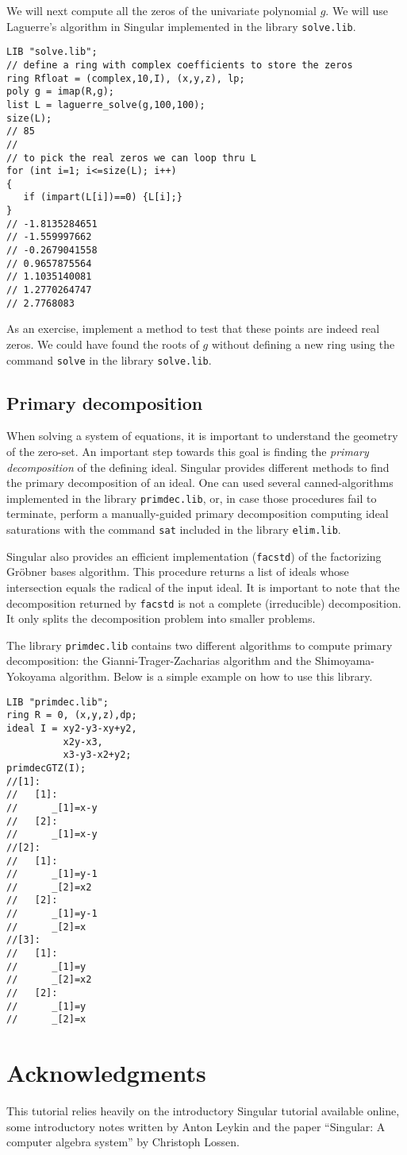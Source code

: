 \documentclass[12pt]{amsart}
\begin{document}
We will next compute all the zeros of the univariate polynomial $g$.
We will use Laguerre's algorithm in Singular implemented in the library
\texttt{solve.lib}.

\begin{verbatim}
LIB "solve.lib";
// define a ring with complex coefficients to store the zeros
ring Rfloat = (complex,10,I), (x,y,z), lp;
poly g = imap(R,g);
list L = laguerre_solve(g,100,100);
size(L);
// 85
//
// to pick the real zeros we can loop thru L
for (int i=1; i<=size(L); i++)
{
   if (impart(L[i])==0) {L[i];}
}
// -1.8135284651
// -1.559997662
// -0.2679041558
// 0.9657875564
// 1.1035140081
// 1.2770264747
// 2.7768083
\end{verbatim}

As an exercise, implement a method to test that these points are indeed real zeros. 
We could have found the roots of $g$ without defining a new ring
using the command \texttt{solve} in the library \texttt{solve.lib}.

\subsection{Primary decomposition}

When solving a system of equations, it is important to understand the geometry
of the zero-set. An important step towards this goal is finding the \emph{primary decomposition}
of the defining ideal. Singular provides different methods to find the primary decomposition
of an ideal. One can used several canned-algorithms implemented in the library \texttt{primdec.lib},
or, in case those procedures fail to terminate, perform a manually-guided primary decomposition
computing ideal saturations with the command \texttt{sat} included in the library \texttt{elim.lib}.

Singular also provides an efficient implementation (\texttt{facstd}) of the factorizing Gr\"obner bases algorithm.   
This procedure returns a list of ideals whose intersection equals the radical of the input ideal. It is
important to note that the decomposition returned by \texttt{facstd} is not a complete (irreducible) decomposition.
It only splits the decomposition problem into smaller problems.

The library \texttt{primdec.lib} contains two different algorithms to compute primary decomposition: the
Gianni-Trager-Zacharias algorithm and the Shimoyama-Yokoyama algorithm. Below is a simple example on how
to use this library.

\begin{verbatim}
LIB "primdec.lib";
ring R = 0, (x,y,z),dp;
ideal I = xy2-y3-xy+y2,
          x2y-x3,
          x3-y3-x2+y2;
primdecGTZ(I);
//[1]:
//   [1]:
//      _[1]=x-y
//   [2]:
//      _[1]=x-y
//[2]:
//   [1]:
//      _[1]=y-1
//      _[2]=x2
//   [2]:
//      _[1]=y-1
//      _[2]=x
//[3]:
//   [1]:
//      _[1]=y
//      _[2]=x2
//   [2]:
//      _[1]=y
//      _[2]=x
\end{verbatim}  

\section*{Acknowledgments}

This tutorial relies heavily on the introductory Singular tutorial available online, 
some introductory notes written by Anton Leykin and the paper ``Singular: A computer
algebra system'' by Christoph Lossen. 
\end{document}
